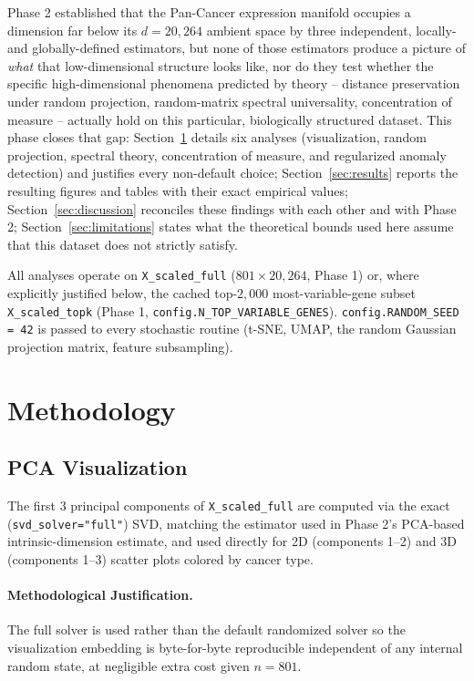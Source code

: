 \documentclass[11pt]{article}
\begin{document}
Phase 2 established that the Pan-Cancer expression manifold occupies a
dimension far below its $d = 20{,}264$ ambient space by three independent,
locally- and globally-defined estimators, but none of those estimators
produce a picture of \emph{what} that low-dimensional structure looks like,
nor do they test whether the specific high-dimensional phenomena predicted
by theory -- distance preservation under random projection, random-matrix
spectral universality, concentration of measure -- actually hold on this
particular, biologically structured dataset. This phase closes that gap:
Section~\ref{sec:methodology} details six analyses (visualization,
random projection, spectral theory, concentration of measure, and
regularized anomaly detection) and justifies every non-default choice;
Section~\ref{sec:results} reports the resulting figures and tables with
their exact empirical values; Section~\ref{sec:discussion} reconciles these
findings with each other and with Phase 2; Section~\ref{sec:limitations}
states what the theoretical bounds used here assume that this dataset does
not strictly satisfy.

All analyses operate on \texttt{X\_scaled\_full} ($801 \times 20{,}264$,
Phase 1) or, where explicitly justified below, the cached top-$2{,}000$
most-variable-gene subset \texttt{X\_scaled\_topk} (Phase 1,
\texttt{config.N\_TOP\_VARIABLE\_GENES}). \texttt{config.RANDOM\_SEED = 42}
is passed to every stochastic routine (t-SNE, UMAP, the random Gaussian
projection matrix, feature subsampling).

\section{Methodology}
\label{sec:methodology}

\subsection{PCA Visualization}

The first $3$ principal components of \texttt{X\_scaled\_full} are computed
via the exact (\texttt{svd\_solver="full"}) SVD, matching the estimator used
in Phase 2's PCA-based intrinsic-dimension estimate, and used directly for
2D (components 1--2) and 3D (components 1--3) scatter plots colored by
cancer type.

\paragraph{Methodological Justification.} The full solver is used rather
than the default randomized solver so the visualization embedding is
byte-for-byte reproducible independent of any internal random state, at
negligible extra cost given $n=801$.
\end{document}
